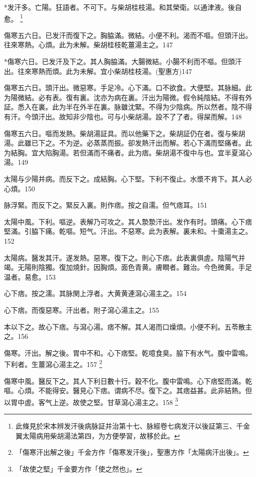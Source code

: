 \documentclass[b5paper,twoside,zihao=-4,UTF8]{ctexbook}
\begin{document}
*发汗多。亡陽。狂語者。不可下。与柴胡桂枝湯。和其榮衛。以通津液。後自愈。
	\footnote{此條見於宋本辨发汗後病脉証并治第十七、脉經卷七病发汗以後証第三、千金翼太陽病用柴胡湯法第四，为方便學習，故移於此。}

傷寒五六日。已发汗而復下之。胸脇滿。微結。小便不利。渴而不嘔。但頭汗出。往來寒熱。心煩。此为未解。柴胡桂枝乾薑湯主之。147

*傷寒六日。已发汗及下之。其人胸脇滿。大腸微結。小腸不利而不嘔。但頭汗出。往來寒熱而煩。此为未解。宜小柴胡桂枝湯。(聖惠方)147

傷寒五六日。頭汗出。微惡寒。手足冷。心下滿。口不欲食。大便堅。其脉細。此为陽微結。必有表。復有裏。沈亦为病在裏。汗出为陽微。假令純陰結。不得有外証。悉入在裏。此为半在外半在裏。脉雖沈緊。不得为少陰病。所以然者。陰不得有汗。今頭汗出。故知非少陰也。可与{小}柴胡湯。設不了了者。得屎而解。148

傷寒五六日。嘔而发熱。柴胡湯証具。而以他藥下之。柴胡証仍在者。復与柴胡湯。此雖已下之。不为逆。必蒸蒸而振。卻发熱汗出而解。若心下滿而堅痛者。此为結胸。宜大陷胸湯。若但滿而不痛者。此为痞。柴胡{湯}不復中与也。宜半夏瀉心湯。149

太陽与少陽并病。而反下之。{成}結胸。心下堅。下利不{復}止。水漿不{肯}下。其人{必}心煩。150

脉浮緊。而反下之。緊反入裏。則作痞。按之自濡。但气痞耳。151

太陽中風。下利。嘔逆。表解乃可攻之。其人漐漐汗出。发作有时。頭痛。心下痞堅滿。引脇下痛。乾嘔。短气。汗出。不惡寒。此为表解。裏未和。十棗湯主之。152

太陽病。醫发其汗。遂发熱。惡寒。復下之。則心下痞。此表裏俱虗。陰陽气并竭。无陽則陰獨。復加燒針。因胸煩。面色青黄。膚瞤者。難治。今色微黄。手足温者。易愈。153

心下痞。按之濡。其脉関上浮者。大黄{黄連}瀉心湯主之。154

心下痞。而復惡寒。汗出者。附子瀉心湯主之。155

本以下之。故心下痞。与瀉心湯。痞不解。其人渴而口燥{煩}。小便不利。五苓散主之。156

傷寒。汗出。解之後。胃中不和。心下痞堅。乾噫食臭。脇下有水气。腹中雷鳴。下利者。生薑瀉心湯主之。157
	\footnote{「傷寒汗出解之後」千金方作「傷寒发汗後」，聖惠方作「太陽病汗出後」。}

傷寒中風。醫反下之。其人下利日數十行。穀不化。腹中雷鳴。心下痞堅而滿。乾嘔。心煩。不能得安。醫見心下痞。谓病不尽。復下之。其痞益甚。此非結熱。但以胃中虗。客气上逆。故使之堅。甘草瀉心湯主之。158
	\footnote{「故使之堅」千金要方作「使之然也」。}
\end{document}
